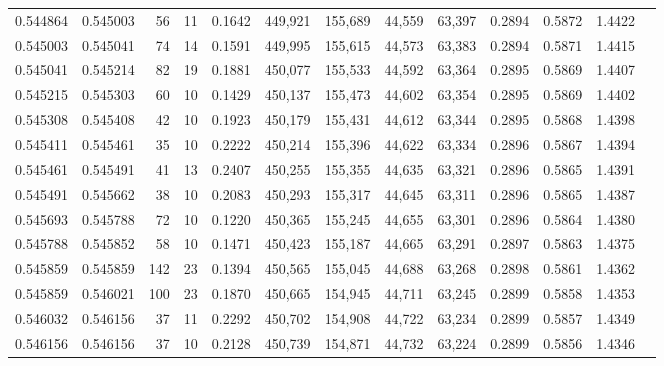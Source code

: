 \begin{tabular}{rrrrrrrrrrrrr}
0.544864 & 0.545003 &    56 &  11 &                                     0.1642 & 449,921 & 155,689 &  44,559 &  63,397 & 0.2894 & 0.5872 & 1.4422 \\
0.545003 & 0.545041 &    74 &  14 &                                     0.1591 & 449,995 & 155,615 &  44,573 &  63,383 & 0.2894 & 0.5871 & 1.4415 \\
0.545041 & 0.545214 &    82 &  19 &                                     0.1881 & 450,077 & 155,533 &  44,592 &  63,364 & 0.2895 & 0.5869 & 1.4407 \\
0.545215 & 0.545303 &    60 &  10 &                                     0.1429 & 450,137 & 155,473 &  44,602 &  63,354 & 0.2895 & 0.5869 & 1.4402 \\
0.545308 & 0.545408 &    42 &  10 &                                     0.1923 & 450,179 & 155,431 &  44,612 &  63,344 & 0.2895 & 0.5868 & 1.4398 \\
0.545411 & 0.545461 &    35 &  10 &                                     0.2222 & 450,214 & 155,396 &  44,622 &  63,334 & 0.2896 & 0.5867 & 1.4394 \\
0.545461 & 0.545491 &    41 &  13 &                                     0.2407 & 450,255 & 155,355 &  44,635 &  63,321 & 0.2896 & 0.5865 & 1.4391 \\
0.545491 & 0.545662 &    38 &  10 &                                     0.2083 & 450,293 & 155,317 &  44,645 &  63,311 & 0.2896 & 0.5865 & 1.4387 \\
0.545693 & 0.545788 &    72 &  10 &                                     0.1220 & 450,365 & 155,245 &  44,655 &  63,301 & 0.2896 & 0.5864 & 1.4380 \\
0.545788 & 0.545852 &    58 &  10 &                                     0.1471 & 450,423 & 155,187 &  44,665 &  63,291 & 0.2897 & 0.5863 & 1.4375 \\
0.545859 & 0.545859 &   142 &  23 &                                     0.1394 & 450,565 & 155,045 &  44,688 &  63,268 & 0.2898 & 0.5861 & 1.4362 \\
0.545859 & 0.546021 &   100 &  23 &                                     0.1870 & 450,665 & 154,945 &  44,711 &  63,245 & 0.2899 & 0.5858 & 1.4353 \\
0.546032 & 0.546156 &    37 &  11 &                                     0.2292 & 450,702 & 154,908 &  44,722 &  63,234 & 0.2899 & 0.5857 & 1.4349 \\
0.546156 & 0.546156 &    37 &  10 &                                     0.2128 & 450,739 & 154,871 &  44,732 &  63,224 & 0.2899 & 0.5856 & 1.4346 \\

\end{tabular}
